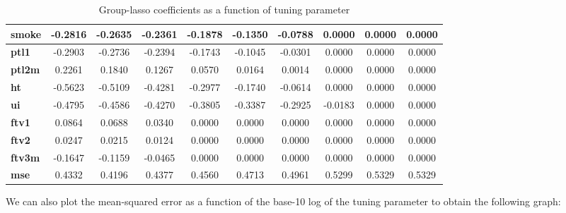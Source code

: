 \documentclass[a4paper,12pt]{article}
\begin{document}
\begin{table}[H]
{\begin{tabular}{|l|c|c|c|c|c|c|c|c|c|}
\textbf{smoke}       & -0.2816         & -0.2635         & -0.2361         & -0.1878         & -0.1350         & -0.0788         & 0.0000          & 0.0000          & 0.0000          \\ \hline
\textbf{ptl1}        & -0.2903         & -0.2736         & -0.2394         & -0.1743         & -0.1045         & -0.0301         & 0.0000          & 0.0000          & 0.0000          \\ \hline
\textbf{ptl2m}       & 0.2261          & 0.1840          & 0.1267          & 0.0570          & 0.0164          & 0.0014          & 0.0000          & 0.0000          & 0.0000          \\ \hline
\textbf{ht}          & -0.5623         & -0.5109         & -0.4281         & -0.2977         & -0.1740         & -0.0614         & 0.0000          & 0.0000          & 0.0000          \\ \hline
\textbf{ui}          & -0.4795         & -0.4586         & -0.4270         & -0.3805         & -0.3387         & -0.2925         & -0.0183         & 0.0000          & 0.0000          \\ \hline
\textbf{ftv1}        & 0.0864          & 0.0688          & 0.0340          & 0.0000          & 0.0000          & 0.0000          & 0.0000          & 0.0000          & 0.0000          \\ \hline
\textbf{ftv2}        & 0.0247          & 0.0215          & 0.0124          & 0.0000          & 0.0000          & 0.0000          & 0.0000          & 0.0000          & 0.0000          \\ \hline
\textbf{ftv3m}       & -0.1647         & -0.1159         & -0.0465         & 0.0000          & 0.0000          & 0.0000          & 0.0000          & 0.0000          & 0.0000          \\ \hline
\textbf{mse}         & 0.4332          & 0.4196          & 0.4377          & 0.4560          & 0.4713          & 0.4961          & 0.5299          & 0.5329          & 0.5329          \\ \hline
\end{tabular}
}
\caption{Group-lasso coefficients as a function of tuning parameter}
\end{table}
\noindent We can also plot the mean-squared error as a function of the base-10 log of the tuning parameter to obtain the following graph:
\end{document}
